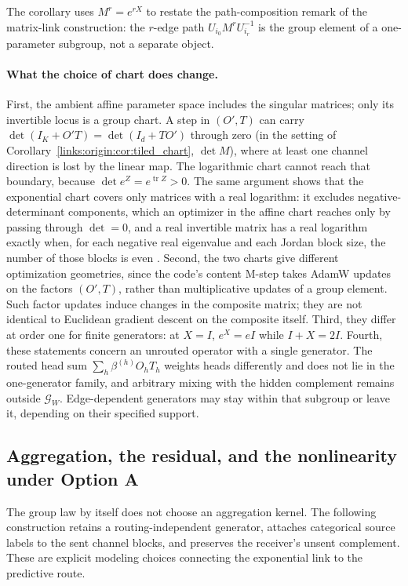 \documentclass[11pt]{article}
\theoremstyle{definition}
\theoremstyle{remark}
\providecommand{\tr}{\operatorname{tr}}
\begin{document}
The corollary uses $M^r=e^{rX}$ to restate the path-composition remark of the matrix-link construction: the $r$-edge path $U_{i_0}M^rU_{i_r}^{-1}$ is the group element of a one-parameter subgroup, not a separate object.

\paragraph{What the choice of chart does change.}
First, the ambient affine parameter space includes the singular matrices; only its invertible locus is a group chart. A step in $(O',T)$ can carry $\det(I_K+O'T)=\det(I_d+TO')$ through zero (in the setting of Corollary~\ref{links:origin:cor:tiled_chart}, $\det M$), where at least one channel direction is lost by the linear map. The logarithmic chart cannot reach that boundary, because $\det e^Z=e^{\tr Z}>0$. The same argument shows that the exponential chart covers only matrices with a real logarithm: it excludes negative-determinant components, which an optimizer in the affine chart reaches only by passing through $\det=0$, and a real invertible matrix has a real logarithm exactly when, for each negative real eigenvalue and each Jordan block size, the number of those blocks is even \cite{frame:Culver1966}. Second, the two charts give different optimization geometries, since the code's content M-step takes AdamW updates on the factors $(O',T)$, rather than multiplicative updates of a group element. Such factor updates induce changes in the composite matrix; they are not identical to Euclidean gradient descent on the composite itself. Third, they differ at order one for finite generators: at $X=I$, $e^X=eI$ while $I+X=2I$. Fourth, these statements concern an unrouted operator with a single generator. The routed head sum $\sum_h\beta^{(h)}O_hT_h$ weights heads differently and does not lie in the one-generator family, and arbitrary mixing with the hidden complement remains outside $\mathcal G_W$. Edge-dependent generators may stay within that subgroup or leave it, depending on their specified support.

\subsection{Aggregation, the residual, and the nonlinearity under Option A}
\label{links:origin:sec:aggregation}

The group law by itself does not choose an aggregation kernel. The following construction retains a routing-independent generator, attaches categorical source labels to the sent channel blocks, and preserves the receiver's unsent complement. These are explicit modeling choices connecting the exponential link to the predictive route.
\end{document}
